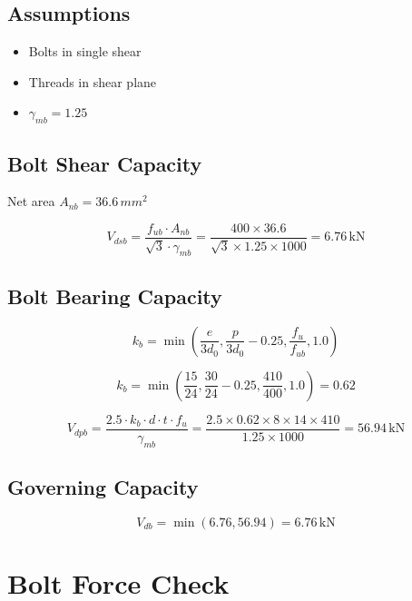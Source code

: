 \subsection{Assumptions}
\begin{itemize}
    \item Bolts in single shear
    \item Threads in shear plane
    \item $\gamma_{mb} = 1.25$
\end{itemize}

\subsection{Bolt Shear Capacity}
Net area $A_{nb} = 36.6 \, mm^2$

\begin{equation}
V_{dsb} = \frac{f_{ub} \cdot A_{nb}}{\sqrt{3} \cdot \gamma_{mb}}
= \frac{400 \times 36.6}{\sqrt{3} \times 1.25 \times 1000}
= 6.76 \, \text{kN}
\end{equation}

\subsection{Bolt Bearing Capacity}

\begin{equation}
k_b = \min\left(\frac{e}{3d_0}, \frac{p}{3d_0} - 0.25, \frac{f_u}{f_{ub}}, 1.0\right)
\end{equation}

\begin{equation}
k_b = \min\left(\frac{15}{24}, \frac{30}{24}-0.25, \frac{410}{400}, 1.0\right) = 0.62
\end{equation}

\begin{equation}
V_{dpb} = \frac{2.5 \cdot k_b \cdot d \cdot t \cdot f_u}{\gamma_{mb}}
= \frac{2.5 \times 0.62 \times 8 \times 14 \times 410}{1.25 \times 1000}
= 56.94 \, \text{kN}
\end{equation}

\subsection{Governing Capacity}

\begin{equation}
V_{db} = \min(6.76, 56.94) = 6.76 \, \text{kN}
\end{equation}

\section{Bolt Force Check}

